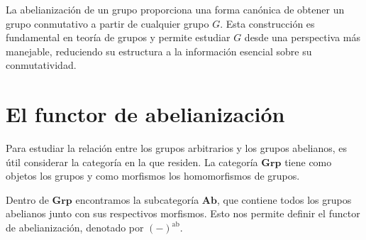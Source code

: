 \begin{definicion}
\end{definicion}





\medskip

\noindent La abelianización de un grupo proporciona una forma canónica de obtener un grupo conmutativo a partir de cualquier grupo \( G \). Esta construcción es fundamental en teoría de grupos y permite estudiar \( G \) desde una perspectiva más manejable, reduciendo su estructura a la información esencial sobre su conmutatividad. 

\begin{ejemplo}
\end{ejemplo}











\section{El functor de abelianización}

\noindent Para estudiar la relación entre los grupos arbitrarios y los grupos abelianos, es útil considerar la categoría en la que residen. La categoría \( \mathbf{Grp} \) tiene como objetos los grupos y como morfismos los homomorfismos de grupos.

\medskip
\noindent Dentro de \( \mathbf{Grp} \) encontramos la subcategoría \( \mathbf{Ab} \), que contiene todos los grupos abelianos junto con sus respectivos morfismos. Esto nos permite definir el functor de abelianización, denotado por \( (-)^{\operatorname{ab}} \).

